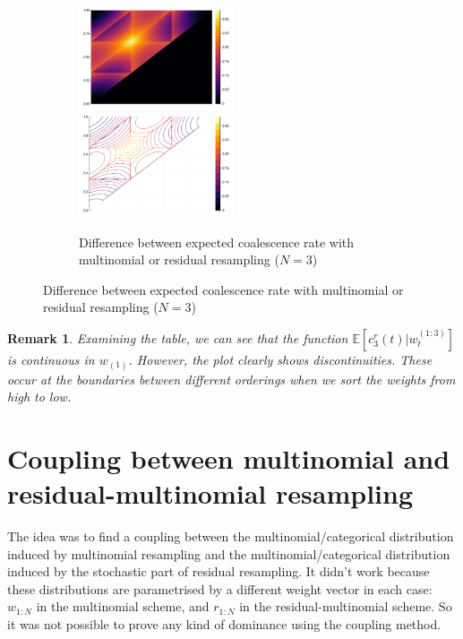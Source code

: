 \documentclass{article}
\newtheorem{remark}{Remark}
\newcommand{\E}{\mathbb{E}}
\newcommand{\1}[1]{\mathbbm{1}_{#1}}
\begin{document}
\begin{figure}
\begin{subfigure}{\textwidth}
		\includegraphics[width=0.5\textwidth]{plots/EcN_mn_res_diff_N3_heatmap.pdf}
		\includegraphics[width=0.5\textwidth]{plots/EcN_mn_res_diff_N3_contour.pdf}
	\caption{Difference between expected coalescence rate with multinomial or residual resampling ($N=3$)}
	\end{subfigure}
\end{figure}

\begin{remark}
Examining the table, we can see that the function $\E[c_3^r(t) |w_t^{(1:3)}]$ is continuous in $w_{(1)}$. However, the plot clearly shows discontinuities. These occur at the boundaries between different orderings when we sort the weights from high to low.
\end{remark}







\section{Coupling between multinomial and residual-multinomial resampling}

The idea was to find a coupling between the multinomial/categorical distribution induced by multinomial resampling and the multinomial/categorical distribution induced by the stochastic part of residual resampling. It didn't work because these distributions are parametrised by a different weight vector in each case: $w_{1:N}$ in the multinomial scheme, and $r_{1:N}$ in the residual-multinomial scheme. So it was not possible to prove any kind of dominance using the coupling method.
\end{document}
